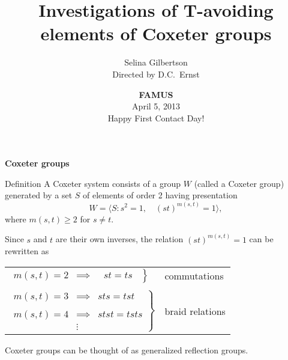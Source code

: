 \documentclass[9pt,handout]{beamer}
\newcommand{\<}{\langle}
\renewcommand{\>}{\rangle}
\begin{document}
\def\newblock{\hskip .11em plus .33em minus .07em}

\title[Investigations of T-avoiding elements of Coxeter groups]
{\textbf{Investigations of T-avoiding elements of Coxeter groups}}
\author[Gilbertson]{Selina Gilbertson\\
Directed by D.C.~Ernst}
\date[FAMUS]{\textbf{FAMUS}\\
April 5, 2013\\
Happy First Contact Day!}

\frame{\titlepage}


\begin{frame}{\textbf{Coxeter groups}}

\begin{block}{Definition}
A {\color{red} Coxeter system} consists of a group $W$ (called a {\color{red}Coxeter group}) generated by a set $S$ of elements of order 2 having presentation
	\[
    W=\<S: s^2=1,\quad (st)^{m(s,t)}=1\>,
    \]
where $m(s,t)\geq 2$ for $s\neq t$.
\end{block}

\pause

\vspace{1em}
    
Since $s$ and $t$ are their own inverses, the relation $(st)^{m(s,t)}=1$ can be rewritten as \pause
    
\begin{center}
\begin{tabular}{ll}
$\left.\begin{array}{lcc}m(s,t)=2 & \implies &\ \ \, st=ts\ \
\end{array}\right\}$& \alert{commutations}\\ \\ \pause
$\left.\begin{array}{lcc}m(s,t)=3 & \implies & sts=tst \\ & & \\ m(s,t)=4 & \implies & stst=tsts \\ & \vdots & \end{array}\right\}$ &\alert{braid relations}
\end{tabular}
\end{center}

\vspace{1em}

\pause

Coxeter groups can be thought of as generalized reflection groups.

\end{frame}
\end{document}
